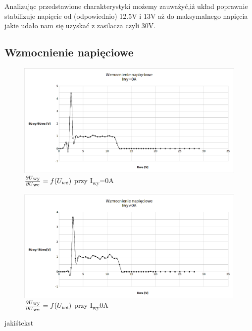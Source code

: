 \documentclass[a4paper,12pt]{article}
\begin{document}
Analizując przedstawione charakterystyki możemy zauważyć,iż układ poprawnie stabilizuje napięcie od (odpowiednio) 12.5V i 13V aż do maksymalnego
napięcia jakie udało nam się uzyskać z zasilacza czyli 30V.
\pagebreak
\subsection{Wzmocnienie napięciowe}
\begin{figure}[h!]
  \center 
  \includegraphics[width=1\textwidth]{wzmocnienie1}
  \caption{ $\frac{\partial U\textsubscript{wy}}{\partial U\textsubscript{we}}=f(U_{we})$ przy I\textsubscript{wy}=0A}
\end{figure}

\begin{figure}[h!]
  \center
  \includegraphics[width=1\textwidth]{wzmocnienie2}
  \caption{ $\frac{\partial U\textsubscript{wy}}{\partial U\textsubscript{we}}=f(U_{we})$ przy I\textsubscript{wy}\neq0A}
\end{figure}

jakiśtekst 
\pagebreak
\end{document}
